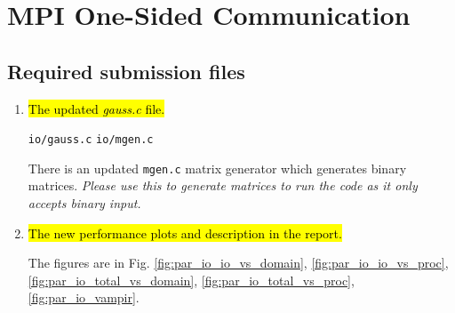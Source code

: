 \section{MPI One-Sided Communication}
\subsection{Required submission files}
\begin{enumerate}
  \item \hl{The updated \emph{gauss.c} file.}
  
  \verb!io/gauss.c!
  \verb!io/mgen.c!
  
  There is an updated \verb!mgen.c! matrix generator which generates binary matrices.
  \emph{Please use this to generate matrices to run the code as it only accepts binary input.}

  \item \hl{The new performance plots and description in the report.}
  
  The figures are in Fig. \ref{fig:par_io_io_vs_domain}, \ref{fig:par_io_io_vs_proc},
  \ref{fig:par_io_total_vs_domain}, \ref{fig:par_io_total_vs_proc}, \ref{fig:par_io_vampir}.

\end{enumerate}

